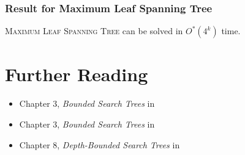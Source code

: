 \begin{frame}
 \frametitle{Result for Maximum Leaf Spanning Tree}
 \begin{theorem}
  \textsc{Maximum Leaf Spanning Tree} can be solved in $O^*(4^k)$ time.
 \end{theorem}
 
\end{frame}


\section{Further Reading}

\begin{frame}

  \begin{itemize}
   \item Chapter 3, \emph{Bounded Search Trees} in \cite{CyganFKL+15}
   \item Chapter 3, \emph{Bounded Search Trees} in \cite{DowneyF13}
   \item Chapter 8, \emph{Depth-Bounded Search Trees} in \cite{Niedermeier06}
  \end{itemize}

\end{frame}

\begin{frame}[t, allowframebreaks]
	\printbibliography
\end{frame}



